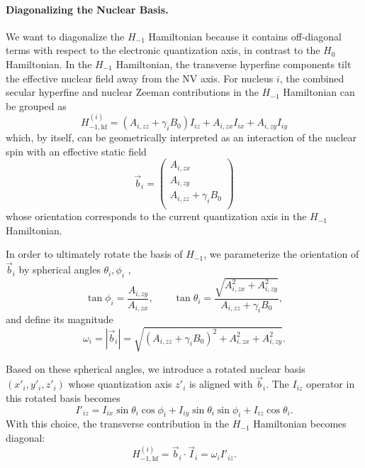 \documentclass[
  aps,
  pra,
  reprint,            %
  superscriptaddress, %
  amsmath,amssymb,
  notitlepage
]{revtex4-2}
\begin{document}
\paragraph{Diagonalizing the Nuclear Basis.}
We want to diagonalize the $H_{-1}$ Hamiltonian because it contains off-diagonal terms with respect to the electronic quantization axis, in contrast to the $H_{0}$ Hamiltonian.
In the $H_{-1}$ Hamiltonian, the transverse hyperfine components tilt the effective nuclear field away from the NV axis. For nucleus $i$, the combined secular hyperfine and nuclear Zeeman contributions in the $H_{-1}$ Hamiltonian can be grouped as
\begin{equation}
    H^{(i)}_{-1,\mathrm{hf}} = (A_{i,zz}+\gamma_iB_0)I_{iz}
    +A_{i,zx}I_{ix}
    +A_{i,zy}I_{iy}
    \label{eq:Hminus_hf}
\end{equation}
which, by itself, can be geometrically interpreted as an interaction of the nuclear spin with an effective static field
\[
\vec b_i = 
\begin{pmatrix}
A_{i,zx}\\
A_{i,zy}\\
A_{i,zz}+\gamma_iB_0\\
\end{pmatrix}
\]
whose orientation corresponds to the current quantization axis in the $H_{-1}$ Hamiltonian.


In order to ultimately rotate the basis of $H_{-1}$, we parameterize the orientation of $\vec b_i$ by spherical angles $\theta_i,\phi_i$ \cite{schweiger2001principles},
\begin{equation}
\tan\phi_i = \frac{A_{i,zy}}{A_{i,zx}},
\qquad
\tan\theta_i = \frac{\sqrt{A_{i,zx}^2+A_{i,zy}^2}}
{A_{i,zz}+\gamma_iB_0},
\label{eq:angles}
\end{equation}
and define its magnitude
\begin{equation}
\omega_i = |\vec b_i| =
\sqrt{ (A_{i,zz}+\gamma_iB_0)^2
+ A_{i,zx}^2
+ A_{i,zy}^2 }.
\label{eq:omega_i}
\end{equation}

Based on these spherical angles, we introduce a rotated nuclear basis $(x'_i,y'_i,z'_i)$ whose quantization axis $z'_i$ is aligned with $\vec b_i$. The $I_{iz}$ operator in this rotated basis becomes 
\begin{equation}
    I'_{iz} = I_{ix}\sin\theta_i\cos\phi_i 
    + I_{iy}\sin\theta_i\sin\phi_i 
    + I_{iz}\cos\theta_i.
    \label{eq:Izprime}
\end{equation}
With this choice, the transverse contribution in the $H_{-1}$ Hamiltonian becomes diagonal:
\[
H^{(i)}_{-1,\mathrm{hf}}= \vec b_i\cdot\vec I_i = \omega_i I'_{iz}.
\]
\end{document}
